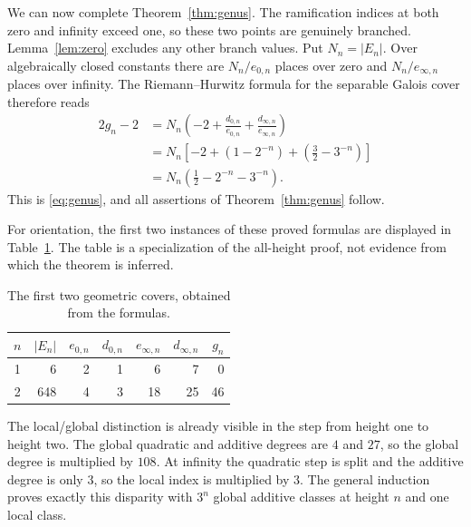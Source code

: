 We can now complete Theorem~\ref{thm:genus}. The ramification
indices at both zero and infinity exceed one, so these two points
are genuinely branched. Lemma~\ref{lem:zero} excludes any other
branch values. Put $N_n=|E_n|$. Over algebraically closed
constants there are $N_n/e_{0,n}$ places over zero and
$N_n/e_{\infty,n}$ places over infinity. The
Riemann--Hurwitz formula for the separable Galois cover therefore
reads
\begin{align*}
 2g_n-2
 &=N_n\left(-2+\frac{d_{0,n}}{e_{0,n}}
                 +\frac{d_{\infty,n}}{e_{\infty,n}}\right)\\
 &=N_n\left[-2+(1-2^{-n})+\left(\frac32-3^{-n}\right)\right]\\
 &=N_n\left(\frac12-2^{-n}-3^{-n}\right).
\end{align*}
This is \eqref{eq:genus}, and all assertions of
Theorem~\ref{thm:genus} follow.

For orientation, the first two instances of these proved formulas
are displayed in Table~\ref{tab:heights}. The table is a
specialization of the all-height proof, not evidence from which
the theorem is inferred.
\begin{table}[ht]
\centering
\caption{The first two geometric covers, obtained from the formulas.}
\label{tab:heights}
\begin{tabular}{crrrrrr}
\toprule
$n$ & $|E_n|$ & $e_{0,n}$ & $d_{0,n}$ &
$e_{\infty,n}$ & $d_{\infty,n}$ & $g_n$\\
\midrule
1 & 6 & 2 & 1 & 6 & 7 & 0\\
2 & 648 & 4 & 3 & 18 & 25 & 46\\
\bottomrule
\end{tabular}
\end{table}

The local/global distinction is already visible in the step from
height one to height two. The global quadratic and additive degrees
are $4$ and $27$, so the global degree is multiplied by $108$.
At infinity the quadratic step is split and the additive degree is
only $3$, so the local index is multiplied by $3$. The general
induction proves exactly this disparity with $3^n$ global additive
classes at height $n$ and one local class.
